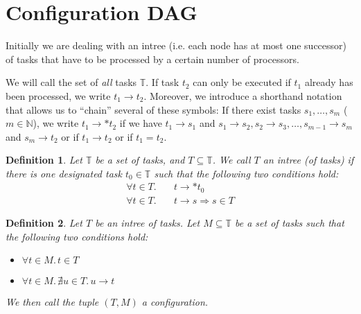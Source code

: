 \documentclass[letter]{report}
\newtheorem{definition}{Definition}[chapter]
\newcommand{\alltasks}{{\mathbb T}}
\newcommand{\neededfor}{\rightarrow}
\begin{document}
\section{Configuration DAG}
\label{sec:configuration-dag}

Initially we are dealing with an intree (i.e. each node has at most one successor) of tasks that have to be processed by a certain number of processors.

We will call the set of \emph{all} tasks $\alltasks$. If task $t_2$ can only be executed if $t_1$ already has been processed, we write $t_1 \neededfor t_2$. Moreover, we introduce a shorthand notation that allows us to ``chain'' several of these symbols: If there exist tasks $s_1,\dots,s_m$ ($m\in\mathbb N$), we write $t_1 \neededfor* t_2$ if we have $t_1 \neededfor s_1$ and $s_1 \neededfor s_2, s_2 \neededfor s_3, \dots, s_{m-1} \neededfor s_m$ and $s_m \neededfor t_2$ or if $t_1\neededfor t_2$ or if $t_1=t_2$.

\begin{definition}
  Let $\alltasks$ be a set of tasks, and $T \subseteq \alltasks$. We call $T$ an intree (of tasks) if there is one designated task $t_0\in\alltasks$ such that the following two conditions hold:
  \begin{eqnarray*}
    \forall  t \in T. & \quad t \neededfor* t_0 \\
    \forall  t \in T. & \quad t\neededfor s \Rightarrow s\in T
  \end{eqnarray*}
\end{definition}

\begin{definition}
  Let $T$ be an intree of tasks. Let $M\subseteq\alltasks$ be a set of tasks such that the following two conditions hold:
  \begin{itemize}
  \item $\forall t\in M.\, t \in T$
  \item $\forall t\in M.\, \nexists u \in T.\, u\neededfor t $
  \end{itemize}
  We then call the tuple $\left( T, M \right)$ a \emph{configuration}.
\end{definition}
\end{document}
